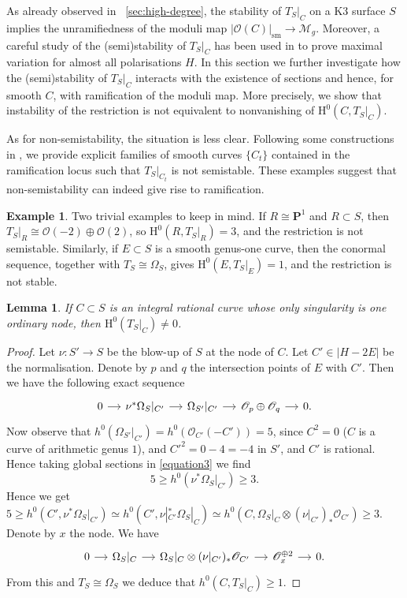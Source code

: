 \documentclass[a4paper,12pt,twoside,reqno]{amsart}
\makeatletter
\numberwithin{equation}{section}
\def\cr@pref#1:#2\@nil{#1}
\newcommand{\cr@tsing}[1]{\@nameuse{cr@map@\cr@pref#1:\@nil}}
\newcommand{\Cref}[1]{\cr@tsing{#1}~\ref{#1}}
\theoremstyle{plain}
\newtheorem{lemma}[theorem]{Lemma}
\theoremstyle{definition}
\newtheorem{example}[theorem]{Example}
\newcommand{\PP}{\mathbf{P}}
\newcommand{\sm}{\mathrm{sm}}
\newcommand{\Mmod}{\mathscr{M}}
\def\ra{\rightarrow}
\newcommand{\tsc}{T_S|_C}
\newcommand{\HH}{\mathrm{H}}
\newcommand{\OO}{\mathscr{O}}
\theoremstyle{plain}
\theoremstyle{definition}
\makeatother
\begin{document}
As already observed in \Cref{sec:high-degree}, the stability of $T_S|_C$ on a K3 surface $S$ implies the unramifiedness of the moduli map $|\OO(C)|_{\sm} \rightarrow \Mmod_g$. Moreover, a careful study of the (semi)stability of $T_S|_C$ has been used in \cite{DH} to prove maximal variation for almost all polarisations $H$. In this section we further investigate how the (semi)stability of $T_S|_C$ interacts with the existence of sections and hence, for smooth $C$, with ramification of the moduli map. More precisely, we show that instability of the restriction is not equivalent to nonvanishing of $\HH^0(C,T_S|_C)$.
 
As for non-semistability, the situation is less clear. Following some
constructions in \cite{GO}, we provide explicit families of smooth
curves \(\{C_t\}\) contained in the ramification locus such that
\(T_S|_{C_t}\) is not semistable. These examples suggest that
non-semistability can indeed give rise to ramification.


\begin{example}
Two trivial examples to keep in mind. If $R\cong\PP^1$ and $R\subset S$, then $T_S|_R\cong\OO(-2)\oplus\OO(2)$, so $\HH^0(R,T_S|_R)=3$, and the restriction is not semistable. Similarly, if $E\subset S$ is a smooth genus-one curve, then the conormal sequence, together with $T_S\cong\Omega_S$, gives $\HH^0(E,T_S|_E)=1$, and the restriction is not stable.
\end{example}

\begin{lemma}\label{lem:nodalh0}
If $C\subset S$ is an integral rational curve whose only singularity is one ordinary node, then $\HH^0(\tsc) \neq 0$.
\end{lemma}
\begin{proof}
Let $\nu\colon S' \ra S$ be the blow-up of $S$ at the node of $C$. Let $C' \in |H-2E|$ be the normalisation. Denote by $p$ and $q$ the intersection points of $E$ with $C'$. Then we have the following exact sequence
\begin{equation}
\label{equation3}
\begin{tikzcd}[column sep=small]
0 \arrow[r] & \nu^*\Omega_S|_{C'} \arrow[r]
& \Omega_{S'}|_{C'} \arrow[r] & \OO_p\oplus\OO_q \arrow[r] & 0.
\end{tikzcd}
\end{equation}
Now observe that $h^0(\Omega_{S'}|_{C'})=h^0(\OO_{C'}(-C'))=5$, since $C^2=0$ ($C$ is a curve of arithmetic genus $1$), and  $C'^2=0-4=-4$ in $S'$, and $C'$ is rational. Hence taking global sections in  \eqref{equation3} we find
\begin{equation*}
5 \geq h^0(\nu^* \Omega_S|_{C'})\geq 3.
\end{equation*}
Hence we get $5 \geq h^0(C',\nu^* \Omega_S|_{C'}) \simeq h^0(C',\nu|_{C'}^*\Omega_S|_C) \simeq h^0(C,\Omega_S|_C \otimes (\nu|_{C'})_*\OO_{C'}) \geq 3$. Denote by $x$ the node. We have
\[
\begin{tikzcd}[column sep=small]
0 \arrow[r] & \Omega_S|_C \arrow[r]
& \Omega_S|_C\otimes(\nu|_{C'})_*\OO_{C'}
\arrow[r] & \OO_x^{\oplus2} \arrow[r] & 0.
\end{tikzcd}
\]
From this and $T_S\cong\Omega_S$ we deduce that $h^0(C,T_S|_C)\geq 1$.
\end{proof}
\end{document}
